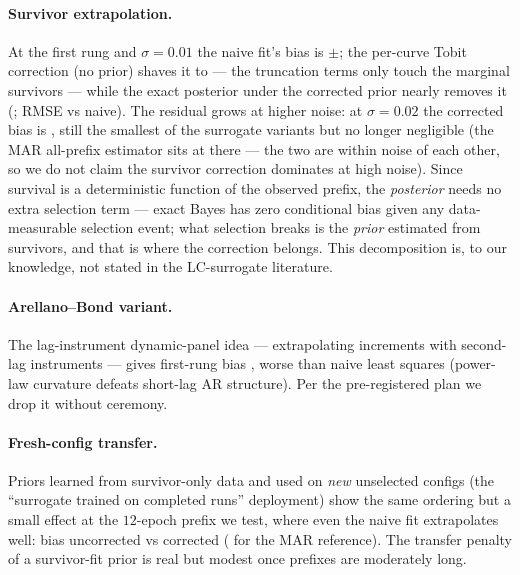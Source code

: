 \documentclass[10pt]{article}
\begin{document}
\paragraph{Survivor extrapolation.} At the first rung and $\sigma = 0.01$
the naive fit's bias is \ExtrapBiasNaive{}$\pm$\ExtrapBiasNaiveSD{}; the
per-curve Tobit correction (no prior) shaves it to \ExtrapBiasTobit{} ---
the truncation terms only touch the marginal survivors --- while the exact
posterior under the corrected prior nearly removes it (\ExtrapBiasHeckMB{};
RMSE \ExtrapRMSEHeckMB{} vs \ExtrapRMSENaive{} naive). The residual grows
at higher noise: at $\sigma = 0.02$ the corrected bias is
\ExtrapBiasHeckMBHi{}, still the smallest of the surrogate variants but no
longer negligible (the MAR all-prefix estimator sits at
\ExtrapBiasEBAllHi{} there --- the two are within noise of each other, so
we do not claim the survivor correction dominates at high noise). Since
survival is a deterministic function of the observed prefix, the
\emph{posterior} needs no extra selection term --- exact Bayes has zero
conditional bias given any data-measurable selection event; what selection
breaks is the \emph{prior} estimated from survivors, and that is where the
correction belongs. This decomposition is, to our knowledge, not stated in
the LC-surrogate literature.

\paragraph{Arellano--Bond variant.} The lag-instrument dynamic-panel
idea \citep{arellano1991} --- extrapolating increments with second-lag
instruments --- gives first-rung bias \ExtrapBiasABIV{}, worse than
naive least squares (power-law curvature defeats short-lag AR
structure). Per the pre-registered plan we drop it without ceremony.

\paragraph{Fresh-config transfer.} Priors learned from survivor-only
data and used on \emph{new} unselected configs (the ``surrogate trained
on completed runs'' deployment) show the same ordering but a small effect
at the $12$-epoch prefix we test, where even the naive fit extrapolates
well: bias \FreshBiasEBSurv{} uncorrected vs \FreshBiasHeckMB{} corrected
(\FreshBiasEBAll{} for the MAR reference). The transfer penalty of a
survivor-fit prior is real but modest once prefixes are moderately long.
\end{document}
